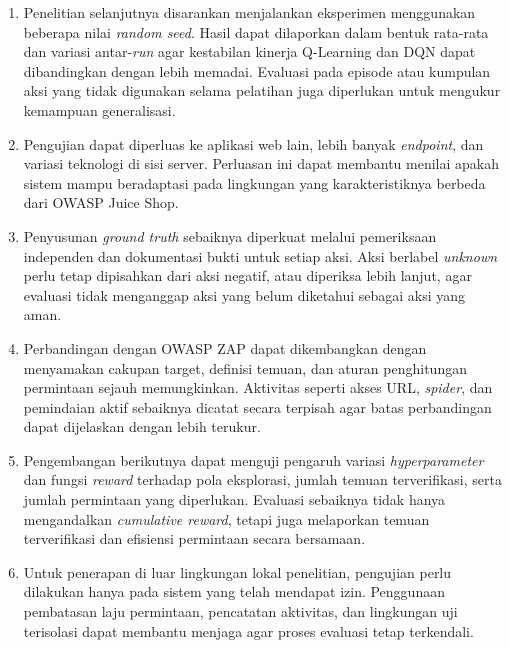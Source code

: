 \begin{enumerate}
    \item Penelitian selanjutnya disarankan menjalankan eksperimen menggunakan beberapa nilai \textit{random seed}. Hasil dapat dilaporkan dalam bentuk rata-rata dan variasi antar-\textit{run} agar kestabilan kinerja Q-Learning dan DQN dapat dibandingkan dengan lebih memadai. Evaluasi pada episode atau kumpulan aksi yang tidak digunakan selama pelatihan juga diperlukan untuk mengukur kemampuan generalisasi.

    \item Pengujian dapat diperluas ke aplikasi web lain, lebih banyak \textit{endpoint}, dan variasi teknologi di sisi server. Perluasan ini dapat membantu menilai apakah sistem mampu beradaptasi pada lingkungan yang karakteristiknya berbeda dari OWASP Juice Shop.

    \item Penyusunan \textit{ground truth} sebaiknya diperkuat melalui pemeriksaan independen dan dokumentasi bukti untuk setiap aksi. Aksi berlabel \textit{unknown} perlu tetap dipisahkan dari aksi negatif, atau diperiksa lebih lanjut, agar evaluasi tidak menganggap aksi yang belum diketahui sebagai aksi yang aman.

    \item Perbandingan dengan OWASP ZAP dapat dikembangkan dengan menyamakan cakupan target, definisi temuan, dan aturan penghitungan permintaan sejauh memungkinkan. Aktivitas seperti akses URL, \textit{spider}, dan pemindaian aktif sebaiknya dicatat secara terpisah agar batas perbandingan dapat dijelaskan dengan lebih terukur.

    \item Pengembangan berikutnya dapat menguji pengaruh variasi \textit{hyperparameter} dan fungsi \textit{reward} terhadap pola eksplorasi, jumlah temuan terverifikasi, serta jumlah permintaan yang diperlukan. Evaluasi sebaiknya tidak hanya mengandalkan \textit{cumulative reward}, tetapi juga melaporkan temuan terverifikasi dan efisiensi permintaan secara bersamaan.

    \item Untuk penerapan di luar lingkungan lokal penelitian, pengujian perlu dilakukan hanya pada sistem yang telah mendapat izin. Penggunaan pembatasan laju permintaan, pencatatan aktivitas, dan lingkungan uji terisolasi dapat membantu menjaga agar proses evaluasi tetap terkendali.
\end{enumerate}
